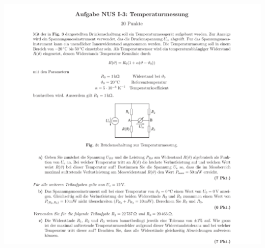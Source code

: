 \documentclass[a4paper, 8pt, landscape]{scrartcl} %
\begin{document}
\begin{multicols}{2}
  \includegraphics[width=\columnwidth]{img/netzw2.pdf} \\

    \vfill \null \columnbreak




\end{multicols}
\end{document}
